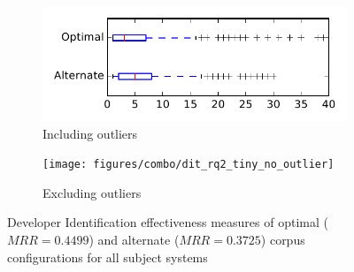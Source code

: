 
\begin{figure}
    \centering
    \begin{subfigure}{.4\textwidth}
        \centering
        \includegraphics[height=0.4\textheight]{figures/combo/dit_rq2_tiny}
        \caption{Including outliers}\label{fig:combo:dit:rq2:tiny_outlier}
    \end{subfigure}%
    \begin{subfigure}{.4\textwidth}
        \centering
        \texttt{[image: figures/combo/dit\_rq2\_tiny\_no\_outlier]}
        \caption{Excluding outliers}\label{fig:combo:dit:rq2:tiny_no_outlier}
    \end{subfigure}
\caption{Developer Identification effectiveness measures of optimal ($MRR=0.4499$) and alternate ($MRR=0.3725$) corpus configurations for all subject systems}
\label{fig:combo:dit:rq2:tiny}
\end{figure}
